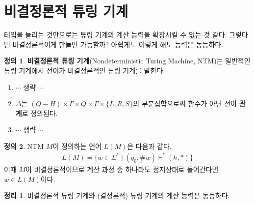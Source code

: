\documentclass[b5paper]{book}
\theoremstyle{definition}
\newtheorem{defn}{정의}[chapter]
\newtheorem{thm}{정리}[chapter]
\begin{document}
\section{비결정론적 튜링 기계}
테입을 늘리는 것만으로는 튜링 기계의 계산 능력을 확장시킬 수 없는 것 같다. 그렇다면 비결정론적이게
만들면 가능할까? 아쉽게도 이렇게 해도 능력은 동등하다.
\begin{defn}
\textbf{비결정론적 튜링 기계}(Nondeterministic Turing Machine, NTM)는 일반적인 튜링 기계에서 
전이가 비결정론적인 튜링 기계를 말한다. 
\begin{enumerate}
    \item $\cdots$ 생략 $\cdots$
    \item $\Delta$는 $(Q-H) \times \Gamma \times Q \times \Gamma \times \{L, R, S\}$의 부분집합으로써 
    함수가 아닌 전이 \textbf{관계}로 정의된다.
    \item $\cdots$ 생략 $\cdots$
\end{enumerate}
\end{defn}
\begin{defn}
    NTM $M$이 정의하는 언어 $L(M)$은 다음과 같다.
    \begin{align*}
        L(M) = \{w \in \Sigma^* \;\vert\; (q_0, \underbar{\#}w) \vdash^* (h, *)\}
    \end{align*}
    이때 $M$이 비결정론적이므로 계산 과정 중 하나라도 정지상태로 들어간다면 $w \in L(M)$이다. 
\end{defn}
\begin{thm}
    비결정론적 튜링 기계와 (결정론적) 튜링 기계의 계산 능력은 동등하다. 
\end{thm}
\end{document}
